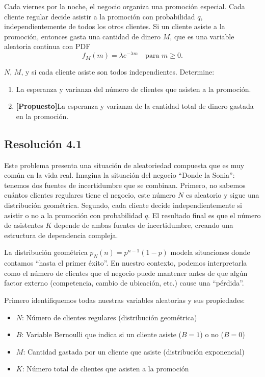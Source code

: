 \documentclass[
  11pt,
  letterpaper,
   addpoints,
  answers
  ]{exam}
\begin{document}
\begin{questions}
Cada viernes por la noche, el negocio organiza una promoción especial. Cada cliente regular decide asistir a la promoción con probabilidad $q$, independientemente de todos los otros clientes. Si un cliente asiste a la promoción, entonces gasta una cantidad de dinero $M$, que es una variable aleatoria continua con PDF
\begin{equation}
f_M(m) = \lambda e^{-\lambda m} \quad \text{para } m \geq 0.
\end{equation}

$N$, $M$, y si cada cliente asiste son todos independientes. Determine:

\begin{enumerate}
    \item La esperanza y varianza del número de clientes que asisten a la promoción.
    
    \item \textbf{[Propuesto]}La esperanza y varianza de la cantidad total de dinero gastada en la promoción.
\end{enumerate}
\begin{solution}
\subsection*{Resolución 4.1}

Este problema presenta una situación  de aleatoriedad compuesta que es muy común en la vida real. Imagina la situación del negocio ``Donde la Sonia'': tenemos dos fuentes de incertidumbre que se combinan. Primero, no sabemos cuántos clientes regulares tiene el negocio, este número $N$ es aleatorio y sigue una distribución geométrica. Segundo, cada cliente decide independientemente si asistir o no a la promoción con probabilidad $q$. El resultado final es que el número de asistentes $K$ depende de ambas fuentes de incertidumbre, creando una estructura de dependencia compleja.

La distribución geométrica $p_N(n) = p^{n-1}(1-p)$ modela situaciones donde contamos ``hasta el primer éxito''. En nuestro contexto, podemos interpretarla como el número de clientes que el negocio puede mantener antes de que algún factor externo (competencia, cambio de ubicación, etc.) cause una ``pérdida''.

Primero identifiquemos todas nuestras variables aleatorias y sus propiedades:

\begin{itemize}
\item $N$: Número de clientes regulares (distribución geométrica)
\item $B$: Variable Bernoulli que indica si un cliente asiste ($B = 1$) o no ($B = 0$)
\item $M$: Cantidad gastada por un cliente que asiste (distribución exponencial)
\item $K$: Número total de clientes que asisten a la promoción
\end{itemize}


\end{solution}
\end{questions}
\end{document}
